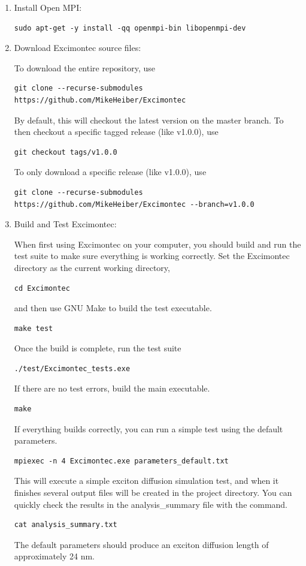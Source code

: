 \documentclass[%
 reprint,onecolumn,notitlepage,
superscriptaddress,longbibliography,
 amsmath,amssymb,
 aps,rmp,floatfix,
]{revtex4-1}
\begin{document}
\begin{enumerate}
\item Install Open MPI:
\begin{verbatim}
sudo apt-get -y install -qq openmpi-bin libopenmpi-dev
\end{verbatim}

\item Download Excimontec source files:
    
To download the entire repository, use
\begin{verbatim}
git clone --recurse-submodules https://github.com/MikeHeiber/Excimontec
\end{verbatim}
By default, this will checkout the latest version on the master branch. 
To then checkout a specific tagged release (like v1.0.0), use
\begin{verbatim}
git checkout tags/v1.0.0
\end{verbatim}
To only download a specific release (like v1.0.0), use 
\begin{verbatim}
git clone --recurse-submodules https://github.com/MikeHeiber/Excimontec --branch=v1.0.0
\end{verbatim}

\item Build and Test Excimontec:

When first using Excimontec on your computer, you should build and run the test suite to make sure everything is working correctly.    
Set the Excimontec directory as the current working directory,
\begin{verbatim}
cd Excimontec
\end{verbatim}
and then use GNU Make to build the test executable.
\begin{verbatim}
make test
\end{verbatim}
Once the build is complete, run the test suite
\begin{verbatim}
./test/Excimontec_tests.exe
\end{verbatim}
If there are no test errors, build the main executable.
\begin{verbatim}
make
\end{verbatim}
If everything builds correctly, you can run a simple test using the default parameters.
\begin{verbatim}
mpiexec -n 4 Excimontec.exe parameters_default.txt
\end{verbatim}

This will execute a simple exciton diffusion simulation test, and when it finishes several output files will be created in the project directory.
You can quickly check the results in the analysis\_summary file with the command.
\begin{verbatim}
cat analysis_summary.txt
\end{verbatim}
The default parameters should produce an exciton diffusion length of approximately 24 nm.

\end{enumerate}
\end{document}
